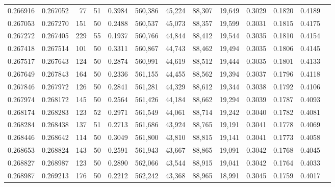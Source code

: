 \begin{tabular}{rrrrrrrrrrrrr}
0.266916 & 0.267052 &    77 &  51 &                                     0.3984 & 560,386 &  45,224 &  88,307 &  19,649 & 0.3029 & 0.1820 & 0.4189 \\
0.267053 & 0.267270 &   151 &  50 &                                     0.2488 & 560,537 &  45,073 &  88,357 &  19,599 & 0.3031 & 0.1815 & 0.4175 \\
0.267272 & 0.267405 &   229 &  55 &                                     0.1937 & 560,766 &  44,844 &  88,412 &  19,544 & 0.3035 & 0.1810 & 0.4154 \\
0.267418 & 0.267514 &   101 &  50 &                                     0.3311 & 560,867 &  44,743 &  88,462 &  19,494 & 0.3035 & 0.1806 & 0.4145 \\
0.267517 & 0.267643 &   124 &  50 &                                     0.2874 & 560,991 &  44,619 &  88,512 &  19,444 & 0.3035 & 0.1801 & 0.4133 \\
0.267649 & 0.267843 &   164 &  50 &                                     0.2336 & 561,155 &  44,455 &  88,562 &  19,394 & 0.3037 & 0.1796 & 0.4118 \\
0.267846 & 0.267972 &   126 &  50 &                                     0.2841 & 561,281 &  44,329 &  88,612 &  19,344 & 0.3038 & 0.1792 & 0.4106 \\
0.267974 & 0.268172 &   145 &  50 &                                     0.2564 & 561,426 &  44,184 &  88,662 &  19,294 & 0.3039 & 0.1787 & 0.4093 \\
0.268174 & 0.268283 &   123 &  52 &                                     0.2971 & 561,549 &  44,061 &  88,714 &  19,242 & 0.3040 & 0.1782 & 0.4081 \\
0.268284 & 0.268438 &   137 &  51 &                                     0.2713 & 561,686 &  43,924 &  88,765 &  19,191 & 0.3041 & 0.1778 & 0.4069 \\
0.268446 & 0.268642 &   114 &  50 &                                     0.3049 & 561,800 &  43,810 &  88,815 &  19,141 & 0.3041 & 0.1773 & 0.4058 \\
0.268653 & 0.268824 &   143 &  50 &                                     0.2591 & 561,943 &  43,667 &  88,865 &  19,091 & 0.3042 & 0.1768 & 0.4045 \\
0.268827 & 0.268987 &   123 &  50 &                                     0.2890 & 562,066 &  43,544 &  88,915 &  19,041 & 0.3042 & 0.1764 & 0.4033 \\
0.268987 & 0.269213 &   176 &  50 &                                     0.2212 & 562,242 &  43,368 &  88,965 &  18,991 & 0.3045 & 0.1759 & 0.4017 \\

\end{tabular}
